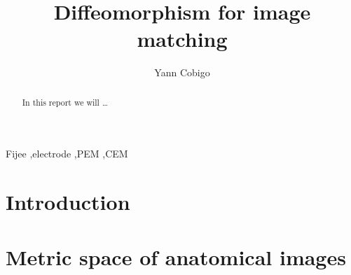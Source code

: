 \documentclass[preprint,review,8pt,times]{elsarticle}
\begin{document}
\begin{frontmatter}

\title{Diffeomorphism for image matching}

\author[label1]{Yann Cobigo}
\address[label1]{University of California, San Francisco | ucsf.edu}




\begin{abstract}
In this report we will \dots
\end{abstract}

\begin{keyword}
Fijee \sep electrode \sep PEM \sep CEM
\end{keyword}

\end{frontmatter}


\section{Introduction}

\section{Metric space of anatomical images}
\end{document}
